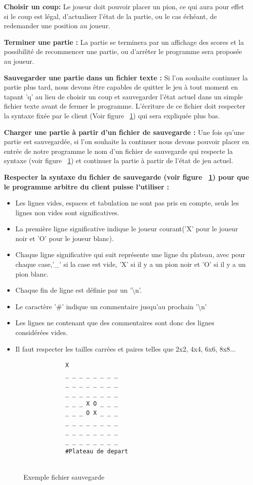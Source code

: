\documentclass[12pt]{article}
\begin{document}
\textbf{Choisir un coup:}
Le joueur doit pouvoir placer un pion, ce qui aura pour effet si le coup est légal, d'actualiser l’état de la partie, ou le cas échéant, de redemander une position au joueur.

\textbf{Terminer une partie : }
La partie se terminera par un affichage des scores et la possibilité de recommencer une partie, ou d’arrêter le programme sera proposée au joueur.

\textbf{Sauvegarder une partie dans un fichier texte :} 
Si l'on souhaite continuer la partie plus tard, nous devons être capables de quitter le jeu à tout moment en tapant 'q' au lieu de choisir un coup et sauvegarder l'état actuel dans un simple fichier texte avant de fermer le programme. L'écriture de ce fichier doit respecter la syntaxe fixée par le client (Voir figure ~\ref{SaveExemple}) qui sera expliquée plus bas.

\textbf{Charger une partie à partir d'un fichier de sauvegarde :}
Une fois qu'une partie est sauvegardée, si l'on souhaite la continuer nous devons pouvoir placer en entrée de notre programme le nom d'un fichier de sauvegarde qui respecte la syntaxe (voir figure ~\ref{SaveExemple}) et continuer la partie à partir de l'état de jeu actuel.

\textbf{Respecter la syntaxe du fichier de sauvegarde (voir figure ~\ref{SaveExemple}) pour que le programme arbitre du client puisse l'utiliser :}

\begin{itemize}
\item Les lignes vides, espaces et tabulation ne sont pas pris en compte, seuls les lignes non vides sont significatives.
\item La première ligne significative indique le joueur courant('X' pour le joueur noir et 'O' pour le joueur blanc).
\item Chaque ligne significative qui suit représente une ligne du plateau, avec pour chaque case,'\_' si la case est vide, 'X' si il y a un pion noir et 'O' si il y a un pion blanc.
\item Chaque fin de ligne est définie par un '\textbackslash n'.
\item Le caractère '\#' indique un commentaire jusqu'au prochain '\textbackslash n'
\item Les lignes ne contenant que des commentaires sont donc des lignes considérées vides.
\item Il faut respecter les tailles carrées et paires telles que 2x2, 4x4, 6x6, 8x8...
\end{itemize}
\begin{figure}[H]

\begin{lstlisting}
		    X
		    _ _ _ _ _ _ _ _
		    _ _ _ _ _ _ _ _
		    _ _ _ _ _ _ _ _
		    _ _ _ X O _ _ _
		    _ _ _ O X _ _ _
		    _ _ _ _ _ _ _ _
		    _ _ _ _ _ _ _ _
		    _ _ _ _ _ _ _ _
		    #Plateau de depart
             
\end{lstlisting}
\caption[SaveExemple]
{Exemple fichier sauvegarde}
\label{SaveExemple}

\end{figure}
\end{document}
